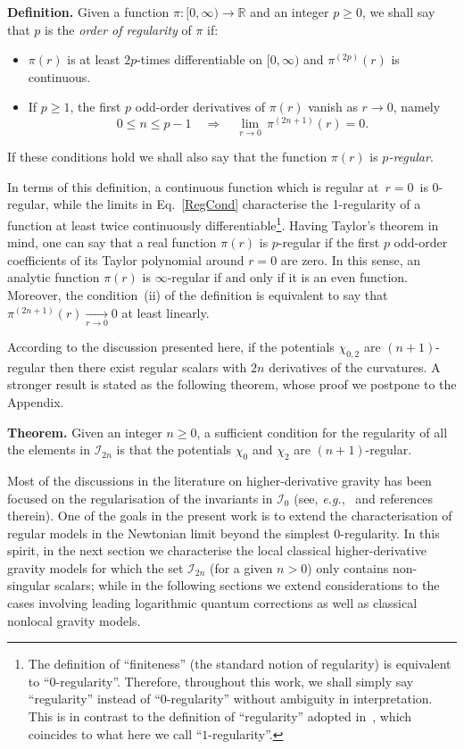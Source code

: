 \documentclass[aps,prd,a4paper,twocolumn,showpacs,showkeys,preprintnumbers,amsmath,amssymb,nofootinbib]{revtex4-2}
\numberwithin{equation}{section}
\begin{document}
\textbf{Definition.} Given a function $\pi:[0,\infty)\to\mathbb{R}$ and an integer $p\geqslant 0$, we shall say that $p$ is the \textit{order of regularity} of $\pi$ 
if:
\begin{itemize}
\item[(i)] $\pi(r)$ is at least $2p$-times differentiable on $[0,\infty)$ and $\pi^{(2p)}(r)$ is continuous.
\item[(ii)] If $p\geqslant 1$, the  first $p$  odd-order derivatives of $\pi(r)$ vanish as $r \to 0$, namely
$$
0 \leqslant n \leqslant p-1 \quad \Longrightarrow \quad \lim_{r \to 0} \, \pi^{(2n+1)}(r) = 0 .
$$
\end{itemize}
If these conditions hold we shall also say that the function $\pi(r)$ is \textit{$p$-regular}. 

In terms of this definition, a continuous function which is regular at $\, r=0 \,$ is 0-regular, while the limits in Eq.~\eqref{RegCond} characterise the 1-regularity of a function at least twice continuously differentiable\footnote{The definition of ``finiteness'' (the standard notion of regularity) is equivalent to ``$0$-regularity''. Therefore, throughout this work, we shall simply say ``regularity'' instead of ``0-regularity'' without ambiguity in interpretation. This is in contrast to the definition of ``regularity'' adopted in~\cite{Frolov:Poly,BreTib1,BreTib2}, which coincides to what here we call ``$1$-regularity''.}.
Having Taylor's theorem in mind, one can say that a real function $\pi(r)$ is $p$-regular if the first $p$ odd-order coefficients of its Taylor polynomial around $r=0$ are zero. In this sense, an analytic function $\pi(r)$ is $\infty$-regular if and only if it is an even function. Moreover, the condition~(ii) of the definition is equivalent to say that $\pi^{(2n+1)}(r) \underset{r \to 0}{\longrightarrow} 0$ at least linearly. 

According to the discussion presented here, if the potentials $\chi_{0,2}$ are $(n+1)$-regular then there exist regular scalars with $2n$ derivatives of the curvatures. A stronger result is stated as the following theorem, whose proof we postpone to the Appendix.

\textbf{Theorem.} Given an integer $n\geqslant 0$, a sufficient condition for the regularity of all the elements in $\mathscr{I}_{2n}$ is that the potentials $\chi_0$ and $\chi_2$ are $(n+1)$-regular.

Most of the discussions in the literature on higher-derivative gravity has been focused on the regularisation of the invariants in $\mathscr{I}_{0}$ (see, \textit{e.g.},~\cite{BreTib1,BreTib2,Frolov:Poly} and references therein). One of the goals in the present work is to extend the characterisation of regular models in the Newtonian limit beyond the simplest $0$-regularity. In this spirit, in the next section we characterise the local classical higher-derivative gravity models for which the set $\mathscr{I}_{2n}$ (for a given $n>0$) only contains non-singular scalars; while in the following sections we extend considerations to the cases involving leading logarithmic quantum corrections as well as classical nonlocal gravity models.
\end{document}
